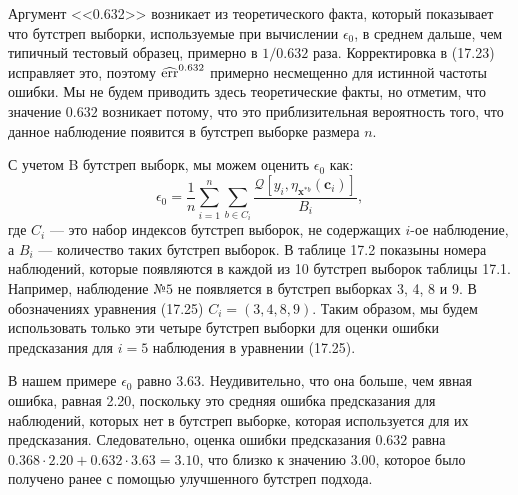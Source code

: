 Аргумент <<0.632>> возникает из теоретического факта, который показывает что бутстреп выборки, используемые при вычислении $\epsilon_{0}$, в среднем дальше, чем типичный тестовый образец, примерно в $1 / 0.632$ раза. Корректировка в (17.23) исправляет это, поэтому $\widehat{\text{err}}^{0.632}$ примерно несмещенно для истинной частоты ошибки. Мы не будем приводить здесь теоретические факты, но отметим, что значение $0.632$ возникает потому, что это приблизительная вероятность того, что данное наблюдение появится в бутстреп выборке размера $n$.

С учетом B бутстреп выборк, мы можем оценить $\epsilon_{0}$ как:
\begin{equation}
\epsilon_{0} = \frac{1}{n}\sum_{i = 1}^{n} \sum_{b \in C_{i}} \frac{ \mathcal{Q}[y_{i},  \eta_{\textbf{x}^{*b}}(\textbf{c}_{i})] }{B_{i}},
\end{equation}
где $C_{i}$ --- это набор индексов бутстреп выборок, не содержащих $i$-ое наблюдение, а $B_{i}$ --- количество таких бутстреп выборок. В таблице 17.2 показыны номера наблюдений, которые появляются в каждой из 10 бутстреп выборок таблицы 17.1. Например, наблюдение $№ 5$ не появляется в бутстреп выборках 3, 4, 8 и 9. В обозначениях уравнения (17.25) $C_{i} = (3, 4, 8, 9)$. Таким образом, мы будем использовать только эти четыре бутстреп выборки для оценки ошибки предсказания для $i = 5$ наблюдения в уравнении (17.25).

В нашем примере $\epsilon_{0}$ равно $3.63$. Неудивительно, что она больше, чем явная ошибка, равная 2.20, поскольку это средняя ошибка предсказания для наблюдений, которых нет в бутстреп выборке, которая используется для их предсказания. Следовательно, оценка ошибки предсказания $0.632$ равна $0.368 \cdot 2.20 + 0.632 \cdot 3.63 = 3.10$, что близко к значению $3.00$, которое было получено ранее с помощью улучшенного бутстреп подхода. 

